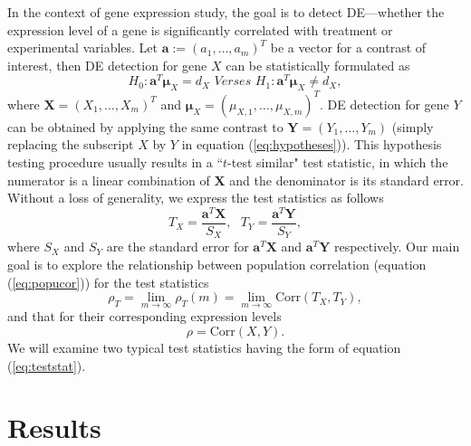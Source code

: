 \documentclass[12pt, a4paper]{article}
\newcommand{\cor}{\text{Corr}}
\begin{document}
	



	 In the context of gene expression study, the goal is to detect DE---whether the expression 
	 level of a gene is 
	 significantly correlated with treatment or experimental variables. Let $\bm a:=(a_1, \ldots, 
	 a_m)^T$ be a vector for a contrast of 
	 interest, then DE detection for gene $X$ can be statistically formulated as 
	 \begin{equation}\label{eq:hypotheses}
	 H_{0}:  \bm a^T\bm \mu_X = d_X \textit{     Verses   }  H_{1}: \bm a^T\bm \mu_X \neq d_X,
	 \end{equation}
	 where $\bm X = (X_1, \ldots, X_m)^T$ and $\bm \mu_{X} = (\mu_{X, 1}, \ldots, \mu_{X, m})^T$. 
	 DE detection for gene $Y$ can be obtained by applying the same contrast to $\bm Y = (Y_1, 
	 \ldots, Y_m)$ (simply replacing the subscript $X$ by $Y$ in equation (\ref{eq:hypotheses})).
	This hypothesis testing procedure usually results in a ``$t$-test similar" test statistic, in which the numerator is a linear combination of 
	$\bm X$ and the denominator is its standard error. Without a loss of generality, we express the test statistics as follows
	\begin{equation}\label{eq:teststat}
	T_X = \dfrac{\bm a^T\bm X}{S_X},  ~~~ T_Y = \dfrac{\bm a^T \bm Y}{S_Y},
	\end{equation}  
	where $S_X$ and $S_Y$ are the standard error for $\bm a^T\bm X$ and $\bm a^T\bm Y$ 
	respectively.	
	Our main goal is to explore the relationship between population correlation (equation 
	(\ref{eq:popucor})) for the test statistics 
	\begin{equation}
	\rho_T= \lim\limits_{m\rightarrow\infty}\rho_T(m) = \lim\limits_{m\rightarrow\infty}\cor({T_X, 
	T_Y}),
	\end{equation}  
	and that for their corresponding expression levels 
	\begin{equation}
	\rho = \cor(X, Y). 
	\end{equation}
	We will examine two typical test statistics having the form of equation (\ref{eq:teststat}).%
		

	
	\section{Results}\label{section:tcorresults}
	
\end{document}
